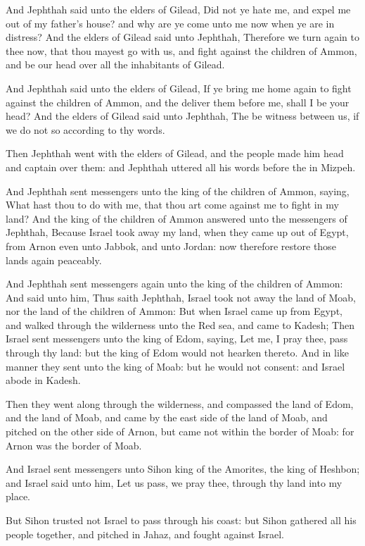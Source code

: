 \verse And Jephthah said unto the elders of Gilead, Did not ye hate me, and expel me out of my father's house? and why are ye come unto me now when ye are in distress?  \verse And the elders of Gilead said unto Jephthah, Therefore we turn again to thee now, that thou mayest go with us, and fight against the children of Ammon, and be our head over all the inhabitants of Gilead.

\verse And Jephthah said unto the elders of Gilead, If ye bring me home again to fight against the children of Ammon, and the \LORD deliver them before me, shall I be your head?  \verse And the elders of Gilead said unto Jephthah, The \LORD be witness between us, if we do not so according to thy words.

\verse Then Jephthah went with the elders of Gilead, and the people made him head and captain over them: and Jephthah uttered all his words before the \LORD in Mizpeh.

\verse And Jephthah sent messengers unto the king of the children of Ammon, saying, What hast thou to do with me, that thou art come against me to fight in my land?  \verse And the king of the children of Ammon answered unto the messengers of Jephthah, Because Israel took away my land, when they came up out of Egypt, from Arnon even unto Jabbok, and unto Jordan: now therefore restore those lands again peaceably.

\verse And Jephthah sent messengers again unto the king of the children of Ammon: \verse And said unto him, Thus saith Jephthah, Israel took not away the land of Moab, nor the land of the children of Ammon: \verse But when Israel came up from Egypt, and walked through the wilderness unto the Red sea, and came to Kadesh; \verse Then Israel sent messengers unto the king of Edom, saying, Let me, I pray thee, pass through thy land: but the king of Edom would not hearken thereto.  And in like manner they sent unto the king of Moab: but he would not consent: and Israel abode in Kadesh.

\verse Then they went along through the wilderness, and compassed the land of Edom, and the land of Moab, and came by the east side of the land of Moab, and pitched on the other side of Arnon, but came not within the border of Moab: for Arnon was the border of Moab.

\verse And Israel sent messengers unto Sihon king of the Amorites, the king of Heshbon; and Israel said unto him, Let us pass, we pray thee, through thy land into my place.

\verse But Sihon trusted not Israel to pass through his coast: but Sihon gathered all his people together, and pitched in Jahaz, and fought against Israel.


